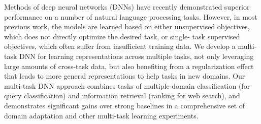 Methods of deep neural networks (DNNs) have recently demonstrated superior performance on a number of natural language processing tasks. However, in most previous work, the models are learned based on either unsupervised objectives, which does not directly optimize the desired task, or single- task supervised objectives, which often suffer from insufficient training data. We develop a multi-task DNN for learning representations across multiple tasks, not only leveraging large amounts of cross-task data, but also benefiting from a regularization effect that leads to more general representations to help tasks in new domains. Our multi-task DNN approach combines tasks of multiple-domain classification (for query classification) and information retrieval (ranking for web search), and demonstrates significant gains over strong baselines in a comprehensive set of domain adaptation and other multi-task learning experiments.
